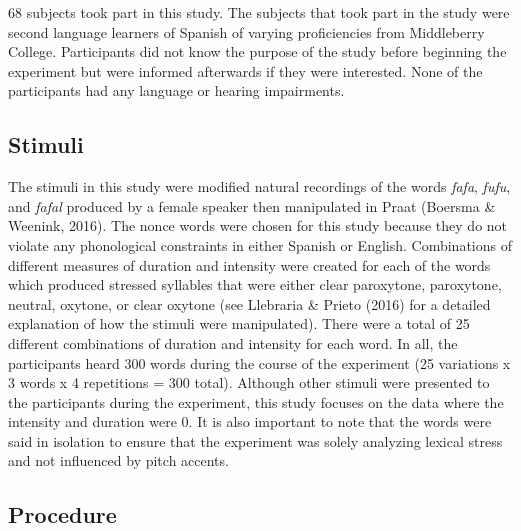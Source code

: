 \documentclass[man]{apa6}
\theoremstyle{definition}
\theoremstyle{definition}
\theoremstyle{definition}
\theoremstyle{remark}
\begin{document}
68 subjects took part in this study. The subjects that took part in the
study were second language learners of Spanish of varying proficiencies
from Middleberry College. Participants did not know the purpose of the
study before beginning the experiment but were informed afterwards if
they were interested. None of the participants had any language or
hearing impairments.

\subsection{Stimuli}\label{stimuli}

The stimuli in this study were modified natural recordings of the words
\emph{fafa}, \emph{fufu}, and \emph{fafal} produced by a female speaker
then manipulated in Praat (Boersma \& Weenink, 2016). The nonce words
were chosen for this study because they do not violate any phonological
constraints in either Spanish or English. Combinations of different
measures of duration and intensity were created for each of the words
which produced stressed syllables that were either clear paroxytone,
paroxytone, neutral, oxytone, or clear oxytone (see Llebraria \& Prieto
(2016) for a detailed explanation of how the stimuli were manipulated).
There were a total of 25 different combinations of duration and
intensity for each word. In all, the participants heard 300 words during
the course of the experiment (25 variations x 3 words x 4 repetitions =
300 total). Although other stimuli were presented to the participants
during the experiment, this study focuses on the data where the
intensity and duration were 0. It is also important to note that the
words were said in isolation to ensure that the experiment was solely
analyzing lexical stress and not influenced by pitch accents.

\subsection{Procedure}\label{procedure}
\end{document}
